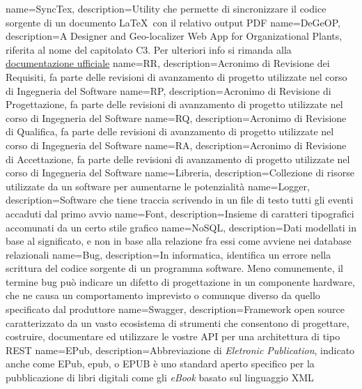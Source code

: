  {
	name=SyncTex,
	description={Utility che permette di sincronizzare il codice sorgente di un documento \LaTeX\ con il relativo output PDF}
}
 {
	name=DeGeOP,
	description={A Designer and Geo-localizer Web App for Organizational Plants, riferita al nome del capitolato C3. Per ulteriori info si rimanda alla \href{http://www.math.unipd.it/~tullio/IS-1/2016/Progetto/C3.pdf}{documentazione ufficiale}}
}
 {
	name=RR,
	description={Acronimo di Revisione dei Requisiti, fa parte delle revisioni di avanzamento di progetto utilizzate nel corso di Ingegneria del Software}
}
 {
	name=RP,
	description={Acronimo di Revisione di Progettazione, fa parte delle revisioni di avanzamento di progetto utilizzate nel corso di Ingegneria del Software}
}
 {
	name=RQ,
	description={Acronimo di Revisione di Qualifica, fa parte delle revisioni di avanzamento di progetto utilizzate nel corso di Ingegneria del Software}
}
 {
	name=RA,
	description={Acronimo di Revisione di Accettazione, fa parte delle revisioni di avanzamento di progetto utilizzate nel corso di Ingegneria del Software}
}
 {
	name=Libreria,
	description={Collezione di risorse utilizzate da un software per aumentarne le potenzialità}
}
 {
	name=Logger,
	description={Software che tiene traccia scrivendo in un file di testo tutti gli eventi accaduti dal primo avvio}
}
 {
	name=Font,
	description={Insieme di caratteri tipografici accomunati da un certo stile grafico}
}
 {
	name=NoSQL,
	description={Dati modellati in base al significato, e non in base alla relazione fra essi come avviene nei database relazionali}
}
 {  
  	name=Bug, 
  	description={In informatica, identifica un errore nella scrittura del codice sorgente di un programma software. Meno comunemente, il termine bug può indicare un difetto di progettazione in un componente hardware, che ne causa un comportamento imprevisto o comunque diverso da quello specificato dal produttore}  
}  
 {  
  	name=Swagger,  
  	description={Framework open source caratterizzato da un vasto ecosistema di strumenti che consentono di progettare, costruire, documentare ed utilizzare le vostre API per una architettura di tipo REST}  
}  
 {  
  	name=EPub,   
  	description={Abbreviazione di \textit{Eletronic Publication}, indicato anche come EPub, epub, o EPUB è uno standard aperto specifico per la pubblicazione di libri digitali come gli \textit{eBook} basato sul linguaggio XML}  
}  
